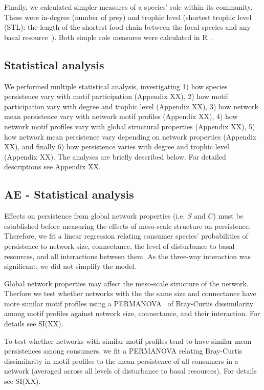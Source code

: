 \documentclass[12pt]{article}
\begin{document}
\begin{spacing}{2.0}
        Finally, we calculated simpler measures of a species' role within its community.
        These were in-degree (number of prey) and trophic level (shortest trophic level (STL): the length of the shortest food chain between the focal species and any basal resource~\citep{Williams2004}).
        Both simple role measures were calculated in R~\citep{R}.
        


	\subsection*{Statistical analysis} 

	We performed multiple statistical analysis, investigating 1) how species persistence vary with motif participation (Appendix XX), 2) how motif participation vary with degree and trophic level (Appendix XX), 3) how network mean persistence vary with network motif profiles (Appendix XX), 4) how network motif profiles vary with global structural properties (Appendix XX), 5) how network mean persistence vary depending on network properties (Appendix XX), and finally 6) how persistence varies with degree and trophic level (Appendix XX). The analyses are briefly described below. For detailed descriptions see Appendix XX.


    \subsection*{AE - Statistical analysis} 

            Effects on persistence from global network properties (i.e. $S$ and $C$) must be established before measuring the effects of meso-scale structure on persistence. Therefore, we fit a linear regression relating consumer species' probabilities of persistence to network size, connectance, the level of disturbance to basal resources, and all interactions between them. As the three-way interaction was significant, we did not simplify the model. 

            Global network properties may affect the meso-scale structure of the network. Therfore we test whether networks with the the same size and connectance have more similar motif profiles using a PERMANOVA~\citep{Anderson2001} of Bray-Curtis dissimilarity among motif profiles against network size, connectance, and their interaction. For details see SI(XX).

            To test whether networks with similar motif profiles tend to have similar mean persistences among consumers, we fit a PERMANOVA relating Bray-Curtis dissimilarity in motif profiles to the mean persistence of all consumers in a network (averaged across all levels of disturbance to basal resources).  For details see SI(XX).


\end{spacing}
\end{document}
